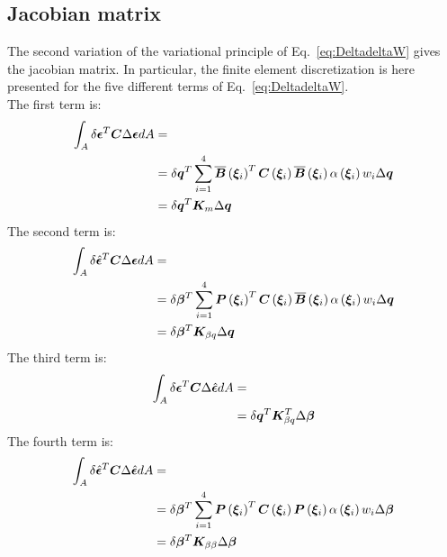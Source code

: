 \subsection{Jacobian matrix}
The second variation of the variational principle of Eq.~\ref{eq:DeltadeltaW} gives the jacobian matrix. In particular, the finite element discretization is here presented for the five different terms of Eq.~\ref{eq:DeltadeltaW}.\\
The first term is:
\begin{equation}
\begin{split}
\int_A \delta {\bm{\epsilon}} ^T  \bm{C}  \Delta {\bm{\epsilon}}  dA & = \\
& = \delta{\bm{q}}^T  \sum_{i=1}^{4} \overline{\bm{B}}\left(  \bm{ \xi }_{ i }  \right)^T  \bm{C}\left(  \bm{ \xi }_{ i }  \right)  \overline{\bm{B}}\left(  \bm{ \xi }_{ i }  \right)  \alpha \left(  \bm{ \xi }_{ i }  \right)   w_i \Delta \bm{q} \\
& = \delta{\bm{q}}^T  \bm{K}_m  \Delta \bm{q}
\end{split}
\end{equation}
The second term is:
\begin{equation}
\begin{split}
\int_A  \delta \hat{{\bm{\epsilon}}} ^T  \bm{C}  \Delta {\bm{\epsilon}} dA & = \\
& = \delta{\bm{\beta}}^T  \sum_{i=1}^{4} \bm{P}\left(  \bm{ \xi }_{ i }  \right)^T  \bm{C}\left(  \bm{ \xi }_{ i }  \right)  \overline{\bm{B}}\left(  \bm{ \xi }_{ i }  \right)  \alpha \left(  \bm{ \xi }_{ i }  \right)  w_i \Delta \bm{q} \\
& = \delta{\bm{\beta}}^T  \bm{K}_{\beta q}  \Delta \bm{q}
\end{split}
\end{equation}
The third term is:
\begin{equation}
\begin{split}
\int_A \delta {\bm{\epsilon}} ^T  \bm{C}  \Delta \hat{{\bm{\epsilon}}} dA & = \\
& = \delta{\bm{q}}^T  \bm{K}_{\beta q}^T  \Delta \bm{\beta}
\end{split}
\end{equation}
The fourth term is:
\begin{equation}
\begin{split}
\int_A \delta \hat{{\bm{\epsilon}}} ^T  \bm{C}  \Delta \hat{{\bm{\epsilon}}} dA & = \\
& = \delta{\bm{\beta}}^T  \sum_{i=1}^{4} \bm{P}\left(  \bm{ \xi }_{ i }  \right)^T  \bm{C}\left(  \bm{ \xi }_{ i }  \right)  \bm{P}\left(  \bm{ \xi }_{ i }  \right)  \alpha \left(  \bm{ \xi }_{ i }  \right)  w_i \Delta \bm{\beta} \\
& = \delta{\bm{\beta}}^T  \bm{K}_{\beta \beta}  \Delta \bm{\beta}
\end{split}
\end{equation}
